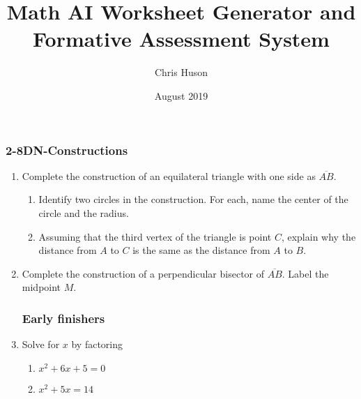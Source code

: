 \documentclass[12pt, twoside]{article}
\title{Math AI Worksheet Generator and Formative Assessment System}
\author{Chris Huson}
\date{August 2019}
\begin{document}
\subsubsection*{2-8DN-Constructions}
\begin{enumerate}
\item Complete the construction of an equilateral triangle with one side as $\overline{AB}$. \vspace{3cm}
  \begin{center}
  \end{center} \vspace{3cm}
  \begin{enumerate}
    \item Identify two circles in the construction. For each, name the center of the circle and the radius.  \vspace{3cm}
    \item Assuming that the third vertex of the triangle is point $C$, explain why the distance from $A$ to $C$ is the same as the distance from $A$ to $B$.
  \end{enumerate}

\newpage
\item Complete the construction of a perpendicular bisector of $\overline{AB}$. Label the midpoint $M$. \vspace{2cm}
  \begin{center}
  \end{center} \vspace{3cm}

  \subsubsection*{Early finishers}
\item Solve for $x$ by factoring
    \begin{multicols}{2}
      \begin{enumerate}
      \item $x^2+6x+5=0$
      \item $x^2+5x=14$
      \end{enumerate}
      \end{multicols}


\end{enumerate}
\end{document}
